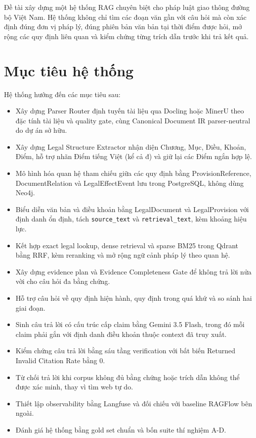 \documentclass[12pt,a4paper]{article}
\begin{document}
Đề tài xây dựng một hệ thống RAG chuyên biệt cho pháp luật giao thông đường bộ Việt Nam. Hệ thống không chỉ tìm các đoạn văn gần với câu hỏi mà còn xác định đúng đơn vị pháp lý, đúng phiên bản văn bản tại thời điểm được hỏi, mở rộng các quy định liên quan và kiểm chứng từng trích dẫn trước khi trả kết quả.

\section{Mục tiêu hệ thống}

Hệ thống hướng đến các mục tiêu sau:

\begin{itemize}
  \item Xây dựng Parser Router định tuyến tài liệu qua Docling hoặc MinerU theo đặc tính tài liệu và quality gate, cùng Canonical Document IR parser-neutral do dự án sở hữu.
  \item Xây dựng Legal Structure Extractor nhận diện Chương, Mục, Điều, Khoản, Điểm, hỗ trợ nhãn Điểm tiếng Việt (kể cả đ) và giữ lại các Điểm ngắn hợp lệ.
  \item Mô hình hóa quan hệ tham chiếu giữa các quy định bằng ProvisionReference, DocumentRelation và LegalEffectEvent lưu trong PostgreSQL, không dùng Neo4j.
  \item Biểu diễn văn bản và điều khoản bằng LegalDocument và LegalProvision với định danh ổn định, tách \texttt{source\_text} và \texttt{retrieval\_text}, kèm khoảng hiệu lực.
  \item Kết hợp exact legal lookup, dense retrieval và sparse BM25 trong Qdrant bằng RRF, kèm reranking và mở rộng ngữ cảnh pháp lý theo quan hệ.
  \item Xây dựng evidence plan và Evidence Completeness Gate để không trả lời nửa vời cho câu hỏi đa bằng chứng.
  \item Hỗ trợ câu hỏi về quy định hiện hành, quy định trong quá khứ và so sánh hai giai đoạn.
  \item Sinh câu trả lời có cấu trúc cấp claim bằng Gemini 3.5 Flash, trong đó mỗi claim phải gắn với định danh điều khoản thuộc context đã truy xuất.
  \item Kiểm chứng câu trả lời bằng sáu tầng verification với bất biến Returned Invalid Citation Rate bằng 0.
  \item Từ chối trả lời khi corpus không đủ bằng chứng hoặc trích dẫn không thể được xác minh, thay vì tìm web tự do.
  \item Thiết lập observability bằng Langfuse và đối chiếu với baseline RAGFlow bên ngoài.
  \item Đánh giá hệ thống bằng gold set chuẩn và bốn suite thí nghiệm A-D.
\end{itemize}
\end{document}
